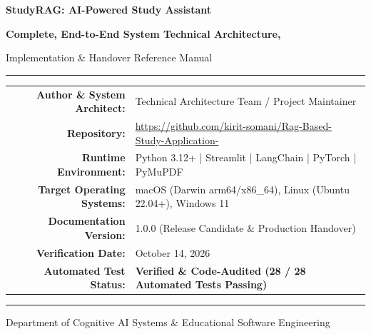 \documentclass[
]{article}
\author{}
\date{}
\begin{document}
\begin{titlepage}
\centering
\vspace*{2.0cm}

{\Huge \bfseries \color{primaryindigo} StudyRAG: AI-Powered Study Assistant\par}
\vspace{0.5cm}
{\Large \bfseries \color{headerblue} Complete, End-to-End System Technical Architecture,\par Implementation \& Handover Reference Manual\par}

\vspace{1.5cm}
{\color{primaryindigo}\rule{0.9\textwidth}{1.5pt}}\par
\vspace{1.0cm}

\begin{flushleft}
\large
\begin{tabular}{rp{10.5cm}}
  \textbf{Author \& System Architect:} & Technical Architecture Team / Project Maintainer \\[7pt]
  \textbf{Repository:} & \url{https://github.com/kirit-somani/Rag-Based-Study-Application-} \\[7pt]
  \textbf{Runtime Environment:} & Python 3.12+ | Streamlit | LangChain | PyTorch | PyMuPDF \\[7pt]
  \textbf{Target Operating Systems:} & macOS (Darwin arm64/x86\_64), Linux (Ubuntu 22.04+), Windows 11 \\[7pt]
  \textbf{Documentation Version:} & 1.0.0 (Release Candidate \& Production Handover) \\[7pt]
  \textbf{Verification Date:} & October 14, 2026 \\[7pt]
  \textbf{Automated Test Status:} & {\color{primaryindigo}\textbf{Verified \& Code-Audited (28 / 28 Automated Tests Passing)}} \\
\end{tabular}
\end{flushleft}

\vspace{1.5cm}
{\color{primaryindigo}\rule{0.9\textwidth}{1.5pt}}\par

\vfill
{\small \textsf{\color{headerblue} Department of Cognitive AI Systems \& Educational Software Engineering}\par}
\vspace{0.8cm}
\end{titlepage}
\end{document}
